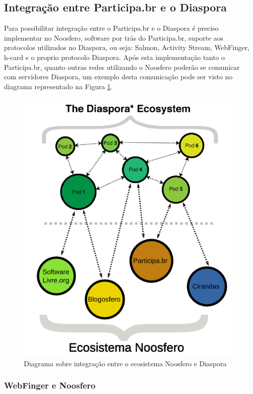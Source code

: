 \documentclass[12pt]{article}
\begin{document}
\subsection{Integração entre Participa.br e o Diaspora}

Para possibilitar integração entre o Participa.br e o Diaspora é preciso
implementar no Noosfero, software por trás do Participa.br, suporte aos
protocolos utilizados no Diaspora, ou seja: Salmon, Activity
Stream, WebFinger, h-card e o proprio protocolo Diaspora. Após esta
implementação tanto o Participa.br, quanto outras redes utilizando o Noosfero
poderão se comunicar com servidores Diaspora, um exemplo desta comunicação
pode ser visto no diagrama representado na Figura \ref{ecosistema}.

\begin{figure}[h]
\center
\includegraphics[scale=0.4]{ecosistema-noosfero-diaspora.png}
\caption{Diagrama sobre integração entre o ecosistema Noosfero e Diaspora}
\label{ecosistema}
\end{figure}

\subsubsection{WebFinger e Noosfero}
\end{document}
